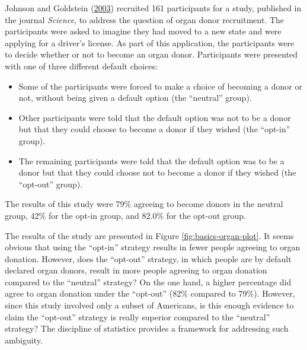 \documentclass[]{book}
\providecommand{\tightlist}{%
  \setlength{\itemsep}{0pt}\setlength{\parskip}{0pt}}
\theoremstyle{definition}
\theoremstyle{definition}
\theoremstyle{definition}
\theoremstyle{remark}
\begin{document}
Johnson and Goldstein (\protect\hyperlink{ref-Johnson2003}{2003})
recruited 161 participants for a study, published in the journal
\emph{Science}, to address the question of organ donor recruitment. The
participants were asked to imagine they had moved to a new state and
were applying for a driver's license. As part of this application, the
participants were to decide whether or not to become an organ donor.
Participants were presented with one of three different default choices:

\begin{itemize}
\tightlist
\item
  Some of the participants were forced to make a choice of becoming a
  donor or not, without being given a default option (the ``neutral''
  group).
\item
  Other participants were told that the default option was not to be a
  donor but that they could choose to become a donor if they wished (the
  ``opt-in'' group).
\item
  The remaining participants were told that the default option was to be
  a donor but that they could choose not to become a donor if they
  wished (the ``opt-out'' group).
\end{itemize}

The results of this study were 79\% agreeing to become donors in the
neutral group, 42\% for the opt-in group, and 82.0\% for the opt-out
group.

The results of the study are presented in Figure
\ref{fig:basics-organ-plot}. It seems obvious that using the ``opt-in''
strategy results in fewer people agreeing to organ donation. However,
does the ``opt-out'' strategy, in which people are by default declared
organ donors, result in more people agreeing to organ donation compared
to the ``neutral'' strategy? On the one hand, a higher percentage did
agree to organ donation under the ``opt-out'' (82\% compared to 79\%).
However, since this study involved only a subset of Americans, is this
enough evidence to claim the ``opt-out'' strategy is really superior
compared to the ``neutral'' strategy? The discipline of statistics
provides a framework for addressing such ambiguity.
\end{document}
